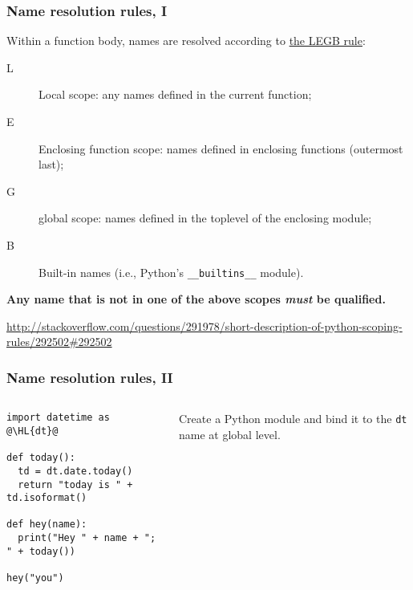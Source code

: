 \documentclass[english,serif,mathserif,xcolor=pdftex,dvipsnames,table]{beamer}
\begin{document}
\begin{frame}[fragile]
  \frametitle{Name resolution rules, I}
  \small

  Within a function body, names are resolved according to \href{http://stackoverflow.com/questions/291978/short-description-of-python-scoping-rules/292502#292502}{the LEGB rule}:
  \begin{description}
  \item[L] Local scope: any names defined in the current function;
  \item[E] Enclosing function scope: names defined in enclosing
    functions (outermost last);
  \item[G] global scope: names defined in the toplevel of the enclosing module;
  \item[B] Built-in names (i.e., Python's \texttt{\_\_builtins\_\_} module).
  \end{description}

  \+
  \textbf{Any name that is not in one of the above scopes \emph{must}
    be qualified.}

  \begin{references}
    \url{http://stackoverflow.com/questions/291978/short-description-of-python-scoping-rules/292502#292502}
  \end{references}
\end{frame}


\begin{frame}[fragile]
  \frametitle{Name resolution rules, II}
  \begin{columns}
    \begin{column}[t]{0.6\linewidth}
\begin{lstlisting}
import datetime as @\HL{dt}@

def today():
  td = dt.date.today()
  return "today is " + td.isoformat()

def hey(name):
  print("Hey " + name + "; " + today())

hey("you")
\end{lstlisting}
    \end{column}
    \begin{column}[t]{0.4\linewidth}
      \raggedleft
      Create a Python module and bind it to the
      \texttt{dt} name at global level.
    \end{column}
  \end{columns}
\end{frame}
\end{document}
